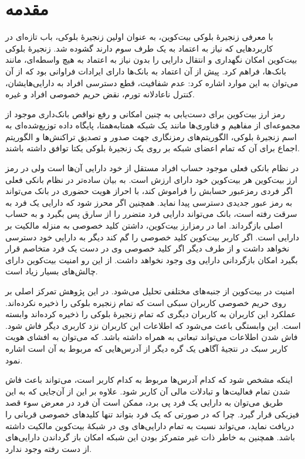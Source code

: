 
\chapter{مقدمه}
با معرفی زنجیرهٔ بلوکی بیت‌کوین، به عنوان اولین زنجیرهٔ بلوکی، باب تازه‌ای در کاربرد‌هایی که نیاز به اعتماد به یک طرف سوم دارند گشوده شد. زنجیرهٔ بلوکی بیت‌کوین امکان نگهداری و انتقال دارایی را بدون نیاز به اعتماد به هیچ واسطه‌ای، مانند بانک‌ها،‌ فراهم کرد. پیش از آن اعتماد به بانک‌ها دارای ایرادات فراوانی بود که از آن می‌توان به این موارد اشاره کرد: عدم شفافیت، قطع دسترسی افراد به دارایی‌هایشان، کنترل ناعادلانه تورم، نقض حریم خصوصی افراد و غیره. 

رمز ارز بیت‌کوین برای دست‌یابی به چنین امکانی و رفع نواقص بانک‌داری موجود از مجموعه‌ای از مفاهیم و فناوری‌ها مانند یک شبکه همتا‌به‌همتا، پایگاه داده توزیع‌شده‌ای به اسم زنجیرهٔ بلوکی، الگوریتم‌های رمزنگاری جهت صدور و تصدیق تراکنش‌ها و الگوریتم اجماع برای آن‌ که تمام اعضای شبکه بر روی یک زنجیرهٔ بلوکی یکتا توافق داشته باشند. 

در نظام بانکی فعلی موجود حساب افراد مستقل از خود دارایی آن‌ها است ولی در رمز ارز بیت‌کوین هر بیت‌کوین خود دارای ارزش است. به بیان ساده‌تر در نظام بانکی فعلی اگر فردی رمزعبور حسابش را فراموش کند، با احراز هویت حضوری در بانک می‌تواند به رمز عبور جدیدی دسترسی پیدا نماید. همچنین اگر محرز شود که دارایی یک فرد به سرقت رفته است، بانک می‌تواند دارایی فرد متضرر را از سارق پس بگیرد و به حساب اصلی بازگرداند. اما در رمزارز بیت‌کوین، داشتن کلید خصوصی به منزله مالکیت بر دارایی است. اگر کاربر بیت‌کوین کلید خصوصی را گم کند دیگر به دارایی خود دسترسی نخواهد داشت و از طرف دیگر اگر کلید خصوصی وی در دست یک فرد متخاصم قرار بگیرد امکان بازگردانی دارایی وی وجود نخواهد داشت. از این رو امنیت بیت‌کوین دارای چالش‌های بسیار زیاد است.

امنیت در بیت‌کوین از جنبه‌های مختلفی تحلیل می‌شود. در این پژوهش تمرکز اصلی بر روی حریم خصوصی کاربران سبکی است که تمام زنجیره بلوکی را ذخیره نکرده‌اند. عملکرد این کاربران به کاربران دیگری که تمام زنجیره‌ٔ بلوکی را ذخیره کرده‌اند وابسته است. این وابستگی باعث می‌شود که اطلاعات این کاربران نزد کاربری دیگر فاش شود. فاش شدن اطلاعات می‌تواند تبعاتی به همراه داشته باشد. که می‌توان به افشای هویت کاربر سبک در نتجیهٔ آگاهی یک گره دیگر از آدرس‌هایی که مربوط به آن است اشاره نمود. 

اینکه مشخص شود که کدام آدرس‌ها مربوط به کدام کاربر است، می‌تواند باعث فاش شدن تمام فعالیت‌ها و تبادلات مالی آن کاربر شود. علاوه بر این از آن‌جایی که به این طریق می‌توان به دارایی یک فرد پی برد، ممکن است آن فرد در معرض سوء قصد فیزیکی قرار گیرد. چرا که در صورتی که یک فرد بتواند تنها کلید‌های خصوصی قربانی را دریافت نماید، می‌تواند نسبت به تمام دارایی‌های وی در شبکه‌ٔ بیت‌کوین مالکیت داشته باشد. همچنین به خاطر ذات غیر متمرکز بودن این شبکه امکان باز گرداندن دارایی‌های از دست رفته وجود ندارد.

